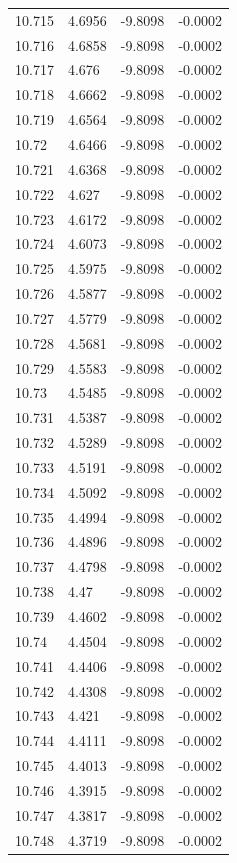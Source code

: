 \begin{tabular}{llll}
10.715 & 4.6956 & -9.8098 & -0.0002 \\
10.716 & 4.6858 & -9.8098 & -0.0002 \\
10.717 & 4.676 & -9.8098 & -0.0002 \\
10.718 & 4.6662 & -9.8098 & -0.0002 \\
10.719 & 4.6564 & -9.8098 & -0.0002 \\
10.72 & 4.6466 & -9.8098 & -0.0002 \\
10.721 & 4.6368 & -9.8098 & -0.0002 \\
10.722 & 4.627 & -9.8098 & -0.0002 \\
10.723 & 4.6172 & -9.8098 & -0.0002 \\
10.724 & 4.6073 & -9.8098 & -0.0002 \\
10.725 & 4.5975 & -9.8098 & -0.0002 \\
10.726 & 4.5877 & -9.8098 & -0.0002 \\
10.727 & 4.5779 & -9.8098 & -0.0002 \\
10.728 & 4.5681 & -9.8098 & -0.0002 \\
10.729 & 4.5583 & -9.8098 & -0.0002 \\
10.73 & 4.5485 & -9.8098 & -0.0002 \\
10.731 & 4.5387 & -9.8098 & -0.0002 \\
10.732 & 4.5289 & -9.8098 & -0.0002 \\
10.733 & 4.5191 & -9.8098 & -0.0002 \\
10.734 & 4.5092 & -9.8098 & -0.0002 \\
10.735 & 4.4994 & -9.8098 & -0.0002 \\
10.736 & 4.4896 & -9.8098 & -0.0002 \\
10.737 & 4.4798 & -9.8098 & -0.0002 \\
10.738 & 4.47 & -9.8098 & -0.0002 \\
10.739 & 4.4602 & -9.8098 & -0.0002 \\
10.74 & 4.4504 & -9.8098 & -0.0002 \\
10.741 & 4.4406 & -9.8098 & -0.0002 \\
10.742 & 4.4308 & -9.8098 & -0.0002 \\
10.743 & 4.421 & -9.8098 & -0.0002 \\
10.744 & 4.4111 & -9.8098 & -0.0002 \\
10.745 & 4.4013 & -9.8098 & -0.0002 \\
10.746 & 4.3915 & -9.8098 & -0.0002 \\
10.747 & 4.3817 & -9.8098 & -0.0002 \\
10.748 & 4.3719 & -9.8098 & -0.0002 \\

\end{tabular}
